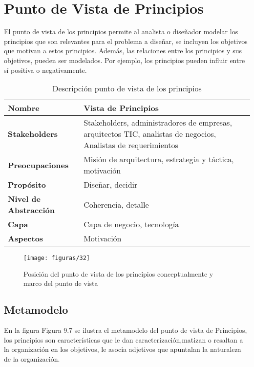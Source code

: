 \section{Punto de Vista de Principios}
El punto de vista de los principios permite al analista o diseñador modelar los principios que son relevantes para el problema a diseñar, se incluyen los objetivos que motivan a estos principios. Además, las relaciones entre los principios y sus objetivos, pueden ser modelados. Por ejemplo, los principios pueden influir entre sí positiva o negativamente.
   
   \begin{table}[H]
   	\centering
   	\begin{tabular}{p{3.7cm}p{8cm}}
   		\hline
   		\rowcolor[HTML]{0073a1}
   		{\color[HTML]{FFFFFF} \textbf{Nombre}} & {\color[HTML]{FFFFFF} \textbf{Vista de Principios}} \\
   		\hline
   		\textbf{Stakeholders} & Stakeholders, administradores de empresas, arquitectos TIC, analistas de negocios, Analistas de requerimientos \\
   		\textbf{Preocupaciones} & Misión de arquitectura, estrategia y táctica, motivación \\
   		\textbf{Propósito} & Diseñar, decidir \\
   		\textbf{Nivel de Abstracción} & Coherencia, detalle \\
   		\textbf{Capa} & Capa de negocio, tecnología \\
   		\textbf{Aspectos} & Motivación \\
   		\bottomrule
   	\end{tabular}
   	\captionsetup{width=.95\textwidth}
   	\caption{Descripción punto de vista de los principios}
   	\label{tabla23}
   \end{table}
   
   \begin{figure}[H]
   	\centering
   	\texttt{[image: figuras/32]}
   	\captionsetup{width=.95\textwidth}
   	\caption{Posición del punto de vista de los principios conceptualmente y marco del punto de vista}
   	\label{figura32}
   \end{figure}
   
   \subsection{Metamodelo}
   En la figura Figura 9.7 se ilustra el metamodelo del punto de vista de Principios, los principios son características que le dan caracterización,matizan o resaltan a la organización en los objetivos, le asocia adjetivos que apuntalan la naturaleza de la organización.
   
